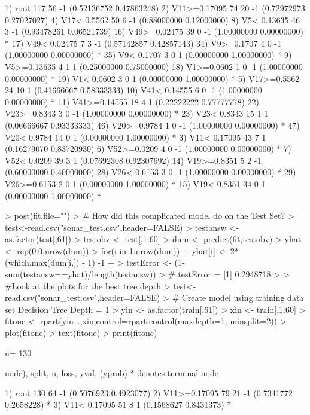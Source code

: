\documentclass{article}
\begin{document}
\begin{Schunk}
\begin{Soutput}
 1) root 117 56 -1 (0.52136752 0.47863248)  
   2) V11>=0.17095 74 20 -1 (0.72972973 0.27027027)  
     4) V17< 0.5562 50  6 -1 (0.88000000 0.12000000)  
       8) V5< 0.13635 46  3 -1 (0.93478261 0.06521739)  
        16) V49>=0.02475 39  0 -1 (1.00000000 0.00000000) *
        17) V49< 0.02475 7  3 -1 (0.57142857 0.42857143)  
          34) V9>=0.1707 4  0 -1 (1.00000000 0.00000000) *
          35) V9< 0.1707 3  0 1 (0.00000000 1.00000000) *
       9) V5>=0.13635 4  1 1 (0.25000000 0.75000000)  
        18) V1>=0.0602 1  0 -1 (1.00000000 0.00000000) *
        19) V1< 0.0602 3  0 1 (0.00000000 1.00000000) *
     5) V17>=0.5562 24 10 1 (0.41666667 0.58333333)  
      10) V41< 0.14555 6  0 -1 (1.00000000 0.00000000) *
      11) V41>=0.14555 18  4 1 (0.22222222 0.77777778)  
        22) V23>=0.8343 3  0 -1 (1.00000000 0.00000000) *
        23) V23< 0.8343 15  1 1 (0.06666667 0.93333333)  
          46) V20>=0.9784 1  0 -1 (1.00000000 0.00000000) *
          47) V20< 0.9784 14  0 1 (0.00000000 1.00000000) *
   3) V11< 0.17095 43  7 1 (0.16279070 0.83720930)  
     6) V52>=0.0209 4  0 -1 (1.00000000 0.00000000) *
     7) V52< 0.0209 39  3 1 (0.07692308 0.92307692)  
      14) V19>=0.8351 5  2 -1 (0.60000000 0.40000000)  
        28) V26< 0.6153 3  0 -1 (1.00000000 0.00000000) *
        29) V26>=0.6153 2  0 1 (0.00000000 1.00000000) *
      15) V19< 0.8351 34  0 1 (0.00000000 1.00000000) *
\end{Soutput}
\begin{Sinput}
> post(fit,file="")
> #  How did this complicated model do on the Test Set?
> test<-read.csv("sonar_test.csv",header=FALSE)
> testansw <- as.factor(test[,61])
> testobv <- test[,1:60]
> dum <- predict(fit,testobv)
> yhat <- rep(0.0,nrow(dum))
> for(i in 1:nrow(dum)){
+ 	yhat[i] <- 2*(which.max(dum[i,]) - 1) -1			
+ }
> testError <- (1-sum(testansw==yhat)/length(testansw))
> # testError = [1] 0.2948718
> 
> #Look at the plots for the best tree depth
> test<-read.csv("sonar_test.csv",header=FALSE)
> # Create model using training data set Decision Tree Depth = 1
> yin <- as.factor(train[,61])
> xin <- train[,1:60]
> fitone <- rpart(yin~.,xin,control=rpart.control(maxdepth=1, minsplit=2))
> plot(fitone)
> text(fitone)
> print(fitone)
\end{Sinput}
\begin{Soutput}
n= 130 

node), split, n, loss, yval, (yprob)
      * denotes terminal node

1) root 130 64 -1 (0.5076923 0.4923077)  
  2) V11>=0.17095 79 21 -1 (0.7341772 0.2658228) *
  3) V11< 0.17095 51  8 1 (0.1568627 0.8431373) *
\end{Soutput}
\end{Schunk}
\end{document}
